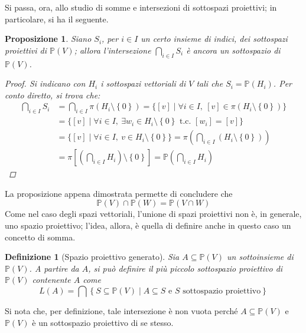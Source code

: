 \documentclass[12pt]{scrartcl}
\theoremstyle{style}
\newtheorem{definizione}{Definizione}[section]
\newtheorem{prop}{Proposizione}[section]
\numberwithin{equation}{subsection}
\begin{document}
Si passa, ora, allo studio di somme e intersezioni di sottospazi proiettivi; in particolare, si ha il seguente.
\begin{prop}
	Siano $S_i$, per $i \in I$ un certo insieme di indici, dei sottospazi proiettivi di $\mathbb{P}(V)$; allora l'intersezione $\bigcap_{i \in I} S_i$ \`e ancora un sottospazio di $\mathbb{P}(V)$.
	\begin{proof}
		Si indicano con $H_i$ i sottospazi vettoriali di $V$ tali che $S_i = \mathbb{P}(H_i)$.
		Per conto diretto, si trova che:
		\[
		\begin{split}
			\bigcap_{i \in I} S_i &= \bigcap _{i\in I} \pi(H_i \setminus\left\{ 0 \right\} ) = \big\{[v]  \mid \forall i \in I, \ [v] \in \pi (H_i \setminus \left\{ 0 \right\} ) \big\}\\
					      &= \big\{[v]  \mid \forall i \in I, \ \exists w_i \in H_i \setminus\left\{ 0 \right\}\text{ t.c. } [w_i] = [v]\big\}\\
					      &=\big\{[v]  \mid \forall i \in I, \ v \in H_i \setminus\left\{ 0 \right\} \big\} = \pi \left(\bigcap_{i \in I} \left(H_i \setminus\left\{ 0 \right\}\right)  \right) \\
					      &= \pi \left[\left(\bigcap_{i \in I} H_i\right) \setminus\left\{ 0 \right\} \right] = \mathbb{P} \left(\bigcap_{i \in I} H_i\right) 
		\end{split}
		\] 
	\end{proof}
\end{prop}
\noindent La proposizione appena dimostrata permette di concludere che
\begin{equation}
	\mathbb{P}(V) \cap \mathbb{P}(W) = \mathbb{P}(V \cap W)
\end{equation}
Come nel caso degli spazi vettoriali, l'unione di spazi proiettivi non \`e, in generale, uno spazio proiettivo; l'idea, allora, \`e quella di definire anche in questo caso un concetto di somma.
\begin{definizione}
	[Spazio proiettivo generato]
	Sia $A \subseteq \mathbb{P}(V)$ un sottoinsieme di $\mathbb{P}(V)$.
	A partire da $A$, si pu\`o definire il pi\`u piccolo sottospazio proiettivo di $\mathbb{P}(V)$ contenente $A$ come
	\[
		L(A) = \bigcap \left\{ S \subseteq \mathbb{P}(V)  \mid A\subseteq S \text{ e } S \text{ sottospazio proiettivo} \right\} 
	\]
\end{definizione}
\noindent Si nota che, per definizione, tale intersezione \`e non vuota perch\'e $A \subseteq \mathbb{P}(V)$ e $\mathbb{P}(V)$ \`e un sottospazio proiettivo di se stesso.
\end{document}
